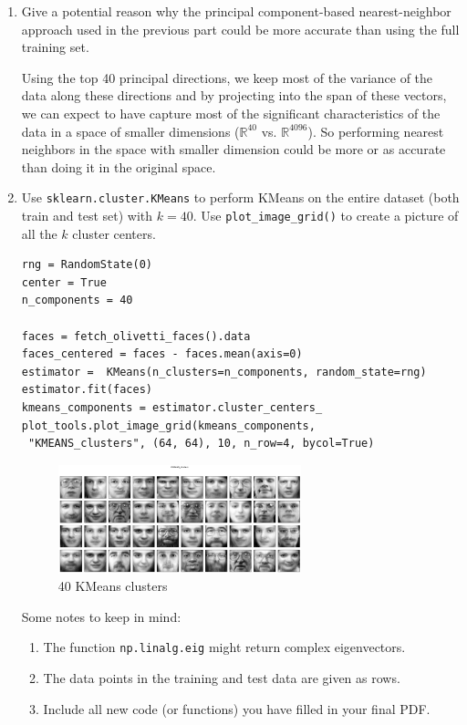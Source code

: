 \documentclass[12pt,twoside]{article}
\begin{document}
\begin{enumerate}
\begin{enumerate}
\item Give a potential reason why the principal component-based 
nearest-neighbor approach used in the previous part could be
more accurate than using the full training set.

Using the top 40 principal directions, we keep most of the variance of the data along these directions and by projecting into the span of these vectors, we can expect to have capture most of the significant characteristics of the data in a space of smaller dimensions ($\mathbb{R}^{40}$ vs. $\mathbb{R}^{4096}$). So performing nearest neighbors in the space with smaller dimension could be more or as accurate than doing it in the original space.
 
\item Use \verb|sklearn.cluster.KMeans| to perform KMeans on the entire dataset (both train and test set) with $k=40$. Use \verb|plot_image_grid()| to create a picture of all the $k$ cluster centers. 

\begin{verbatim} 
rng = RandomState(0)
center = True
n_components = 40

faces = fetch_olivetti_faces().data
faces_centered = faces - faces.mean(axis=0)
estimator =  KMeans(n_clusters=n_components, random_state=rng)
estimator.fit(faces)
kmeans_components = estimator.cluster_centers_
plot_tools.plot_image_grid(kmeans_components,
 "KMEANS_clusters", (64, 64), 10, n_row=4, bycol=True)
\end{verbatim}

	\begin{figure}[H]
		\centering
		\includegraphics[width=200pt]{figures/KMEANS_clusters}
		\caption{40 KMeans clusters}
		\label{fig9}
	\end{figure}
	


 Some notes to keep in mind:
  \begin{enumerate}
  \item The function {\tt np.linalg.eig} might return complex eigenvectors.
  \item The data points in the training and test data are given as
    rows.
    \item Include all new code (or functions) you have filled in your final PDF.
 \end{enumerate}
 


	\end{enumerate}
  
\end{enumerate}
\end{document}

